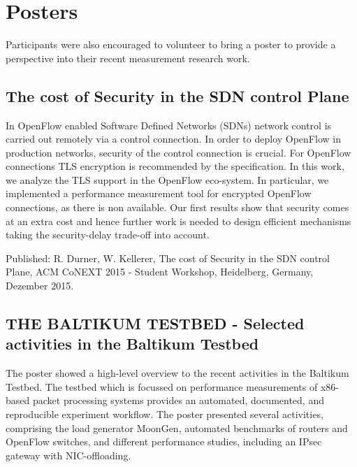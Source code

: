 \section{Posters}\label{sec:posters}

Participants were also encouraged to volunteer to bring a poster to provide a
perspective into their recent measurement research work.

\subsection{The cost of Security in the SDN control Plane}

In OpenFlow enabled Software Defined Networks (SDNs) network control is
carried out remotely via a control connection. In order to deploy OpenFlow in
production networks, security of the control connection is crucial. For
OpenFlow connections TLS encryption is recommended by the specification. In
this work, we analyze the TLS support in the OpenFlow eco-system. In
particular, we implemented a performance measurement tool for encrypted
OpenFlow connections, as there is non available.  Our first results show that
security comes at an extra cost and hence further work is needed to design
efficient mechanisms taking the security-delay trade-off into account.

Published: R. Durner, W. Kellerer, The cost of Security in the SDN control
Plane, ACM CoNEXT 2015 - Student Workshop, Heidelberg, Germany, Dezember 2015.


\subsection{THE BALTIKUM TESTBED - Selected activities in the Baltikum Testbed}

The poster showed a high-level overview to the recent activities in the
Baltikum Testbed. The testbed which is focussed on performance measurements of
x86-based packet processing systems provides an automated, documented, and
reproducible experiment workflow. The poster presented several activities,
comprising the load generator MoonGen, automated benchmarks of routers and
OpenFlow switches, and different performance studies, including an IPsec
gateway with NIC-offloading.

